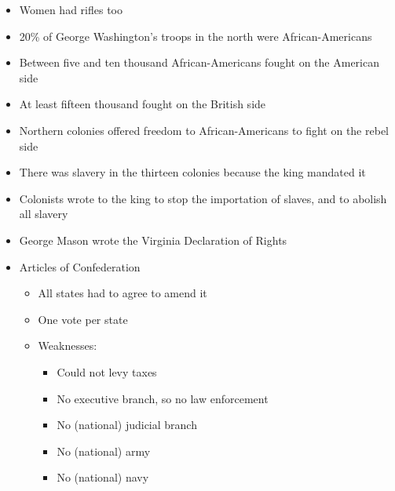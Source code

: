 \documentclass[12pt]{article}
\begin{document}
\begin{itemize}
\begin{itemize}
    \end{itemize}

  \item Women had rifles too

  \item 20\% of George Washington's troops in the north were African-Americans

  \item Between five and ten thousand African-Americans fought on the American side

  \item At least fifteen thousand fought on the British side

  \item Northern colonies offered freedom to African-Americans to fight on the rebel side

  \item There was slavery in the thirteen colonies because the king mandated it

  \item Colonists wrote to the king to stop the importation of slaves, and to abolish all slavery

  \item George Mason wrote the Virginia Declaration of Rights

  \item Articles of Confederation

    \begin{itemize}

      \item All states had to agree to amend it

      \item One vote per state

      \item Weaknesses:

        \begin{itemize}

          \item Could not levy taxes

          \item No executive branch, so no law enforcement

          \item No (national) judicial branch

          \item No (national) army

          \item No (national) navy


\end{itemize}
\end{itemize}
\end{itemize}
\end{document}
